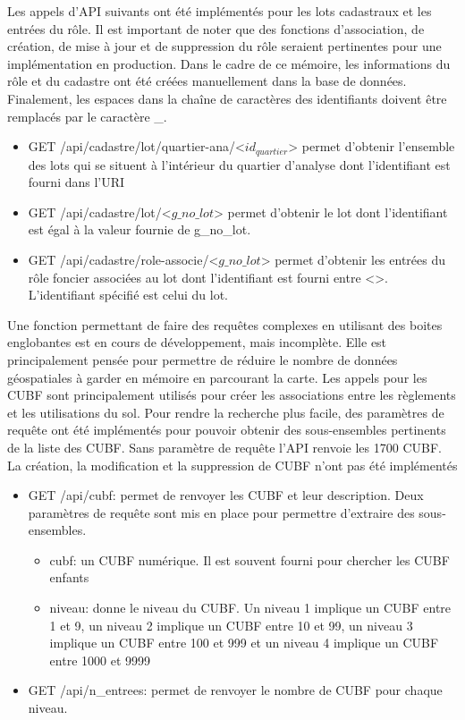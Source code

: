 Les appels d'\ac{API} suivants ont été implémentés pour les lots cadastraux et les entrées du rôle. Il est important de noter que des fonctions d'association, de création, de mise à jour et de suppression du rôle seraient pertinentes pour une implémentation en production. Dans le cadre de ce mémoire, les informations du rôle et du cadastre ont été créées manuellement dans la base de données. Finalement, les espaces dans la chaîne de caractères des identifiants doivent être remplacés par le caractère \_.
\begin{itemize}
    \item GET /api/cadastre/lot/quartier-ana/<$id_{quartier}$> permet d'obtenir l'ensemble des lots qui se situent à l'intérieur du quartier d'analyse dont l'identifiant est fourni dans l'\ac{URI}
    \item GET /api/cadastre/lot/<$g\_no\_lot$> permet d'obtenir le lot dont l'identifiant est égal à la valeur fournie de g\_no\_lot.
    \item GET /api/cadastre/role-associe/<$g\_no\_lot$> permet d'obtenir les entrées du rôle foncier associées au lot dont l'identifiant est fourni entre <>. L'identifiant spécifié est celui du lot.
\end{itemize}
Une fonction permettant de faire des requêtes complexes en utilisant des boites englobantes est en cours de développement, mais incomplète. Elle est principalement pensée pour permettre de réduire le nombre de données géospatiales à garder en mémoire en parcourant la carte. 
Les appels pour les \ac{CUBF} sont principalement utilisés pour créer les associations entre les règlements et les utilisations du sol. Pour rendre la recherche plus facile, des paramètres de requête ont été implémentés pour pouvoir obtenir des sous-ensembles pertinents de la liste des \ac{CUBF}. Sans paramètre de requête l'\ac{API} renvoie les 1700 \ac{CUBF}. La création, la modification et la suppression de \ac{CUBF} n'ont pas été implémentés
\begin{itemize}
    \item GET /api/cubf: permet de renvoyer les \ac{CUBF} et leur description. Deux paramètres de requête sont mis en place pour permettre d'extraire des sous-ensembles.
    \begin{itemize}
        \item cubf: un \ac{CUBF} numérique. Il est souvent fourni pour chercher les \ac{CUBF} enfants
        \item niveau: donne le niveau du \ac{CUBF}. Un niveau 1 implique un \ac{CUBF} entre 1 et 9, un niveau 2 implique un \ac{CUBF} entre 10 et 99, un niveau 3 implique un \ac{CUBF} entre 100 et 999 et un niveau 4 implique un \ac{CUBF} entre 1000 et 9999
    \end{itemize}
    \item GET /api/n\_entrees: permet de renvoyer le nombre de \ac{CUBF} pour chaque niveau.
\end{itemize}
